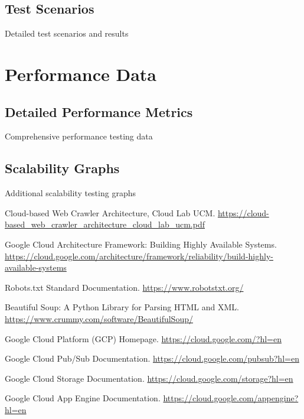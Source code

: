 \documentclass[12pt,a4paper]{report}
\begin{document}
\section{Test Scenarios}
Detailed test scenarios and results

\chapter{Performance Data}

\section{Detailed Performance Metrics}
Comprehensive performance testing data

\section{Scalability Graphs}
Additional scalability testing graphs


\begin{thebibliography}{9}

Cloud-based Web Crawler Architecture, Cloud Lab UCM. 
\url{https://cloud-based_web_crawler_architecture_cloud_lab_ucm.pdf}

Google Cloud Architecture Framework: Building Highly Available Systems. 
\url{https://cloud.google.com/architecture/framework/reliability/build-highly-available-systems}

Robots.txt Standard Documentation. 
\url{https://www.robotstxt.org/}

Beautiful Soup: A Python Library for Parsing HTML and XML. 
\url{https://www.crummy.com/software/BeautifulSoup/}

Google Cloud Platform (GCP) Homepage. 
\url{https://cloud.google.com/?hl=en}


Google Cloud Pub/Sub Documentation. 
\url{https://cloud.google.com/pubsub?hl=en}

Google Cloud Storage Documentation. 
\url{https://cloud.google.com/storage?hl=en}

Google Cloud App Engine Documentation. 
\url{https://cloud.google.com/appengine?hl=en}

\end{thebibliography}   
\end{document}
